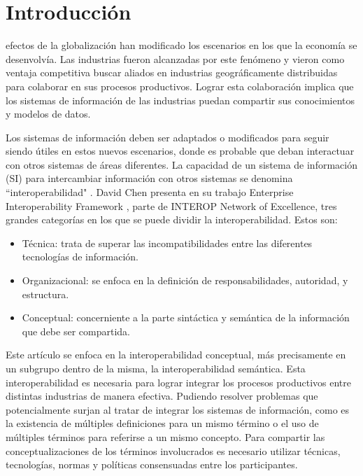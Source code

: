 \documentclass[journal]{IEEEtran}
\begin{document}
\section{Introducci\'on}
% 
% 
% 
% 
 efectos de la globalizaci\'on han modificado los escenarios en los que la econom\'ia se desenvolv\'ia. Las industrias fueron alcanzadas por este fen\'omeno y vieron como ventaja competitiva buscar aliados en industrias geogr\'aficamente distribuidas para colaborar en sus procesos productivos. Lograr esta colaboraci\'on implica que los sistemas de informaci\'on de las industrias puedan compartir sus conocimientos y modelos de datos. 

Los sistemas de informaci\'on deben ser adaptados o modificados para seguir siendo \'utiles en estos nuevos escenarios, donde es probable que deban interactuar con otros sistemas de \'areas diferentes. La capacidad de un sistema de informaci\'on (SI) para intercambiar informaci\'on con otros sistemas se denomina ``interoperabilidad" \cite{Ray2006}. David Chen presenta en su trabajo Enterprise Interoperability Framework \cite{Sinderen2011}, parte de INTEROP Network of Excellence, tres grandes categor\'ias en los que se puede dividir la interoperabilidad. Estos son:

\begin{itemize}
\item T\'ecnica: trata de superar las incompatibilidades entre las diferentes tecnolog\'ias de informaci\'on.  
\item Organizacional: se enfoca en la definici\'on de responsabilidades, autoridad, y estructura. 
\item Conceptual: concerniente a la parte sint\'actica y sem\'antica de la informaci\'on que debe ser compartida.
\end{itemize}

Este art\'iculo se enfoca en la interoperabilidad conceptual, m\'as precisamente en un subgrupo dentro de la misma, la interoperabilidad sem\'antica. Esta interoperabilidad es necesaria para lograr integrar los procesos productivos entre distintas industrias de manera efectiva. Pudiendo resolver problemas que potencialmente surjan al tratar de integrar los sistemas de informaci\'on, como es la existencia de m\'ultiples definiciones para un mismo t\'ermino o el uso de m\'ultiples t\'erminos para referirse a un mismo concepto. Para compartir las conceptualizaciones de los t\'erminos involucrados es necesario utilizar t\'ecnicas, tecnolog\'ias, normas y pol\'iticas consensuadas entre los participantes. 
\end{document}
